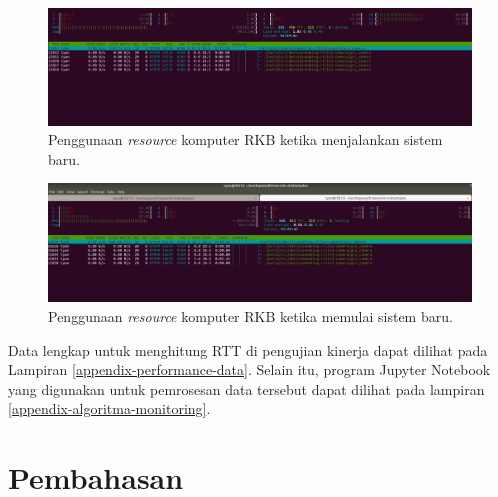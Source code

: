 \begin{figure}[!htbp]
	\centering
	\includegraphics[width=1.0\textwidth]{resources/chapter-4/resource-usage-new-hils-rkb-startup.png}
	\caption{Penggunaan \textit{resource} komputer RKB ketika menjalankan sistem baru.}
	\label{chapter-4-fig-perf-result-resource-usage-rkb}
\end{figure}
\begin{figure}[!htbp]
	\centering
	\includegraphics[width=1.0\textwidth,trim={0cm 0cm 0cm 2.5cm},clip]{resources/chapter-4/resource-usage-new-hils-rkb.png}
	\caption{Penggunaan \textit{resource} komputer RKB ketika memulai sistem baru.}
	\label{chapter-4-fig-perf-result-resource-usage-rkb-startup}
\end{figure}

Data lengkap untuk menghitung RTT di pengujian kinerja dapat dilihat pada
Lampiran \ref{appendix-performance-data}. Selain itu, program Jupyter Notebook
yang digunakan untuk pemrosesan data tersebut dapat dilihat pada lampiran
\ref{appendix-algoritma-monitoring}.

\section{Pembahasan}
\blindtext
